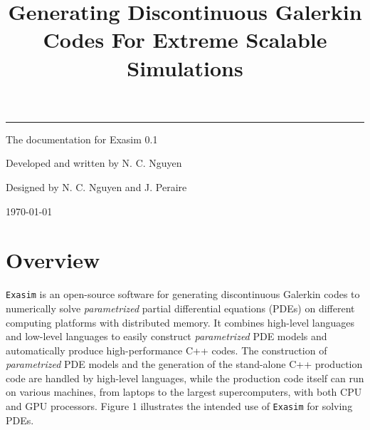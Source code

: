 \documentclass[11pt]{article}
\date{}
\begin{document}
    
        \title{\huge Generating Discontinuous Galerkin Codes For Extreme Scalable Simulations}
        
    \maketitle

 \rule{16.4cm}{0.25cm} 

\hspace{8cm} {\large The documentation for Exasim 0.1}

\hspace{8cm}    {\large Developed and written by N. C. Nguyen}

\hspace{8cm}   {\large Designed by N. C. Nguyen and J. Peraire}
        
\hspace{8cm} {\large \today}
    
\vspace{6cm}

    
    \newpage
    
\section{Overview}

\texttt{Exasim} is an open-source software for generating discontinuous Galerkin codes to numerically solve {\em parametrized} partial differential equations (PDEs) on different computing platforms with distributed memory.  It combines high-level languages  and low-level languages to easily construct {\em parametrized} PDE models and automatically produce high-performance C++ codes. The construction of {\em parametrized} PDE models and the generation of the stand-alone C++ production code are handled by high-level languages, while the production code itself can run on various machines, from laptops to the largest supercomputers, with both CPU and GPU processors. Figure 1 illustrates  the intended use of \texttt{Exasim} for solving PDEs.

\end{document}
